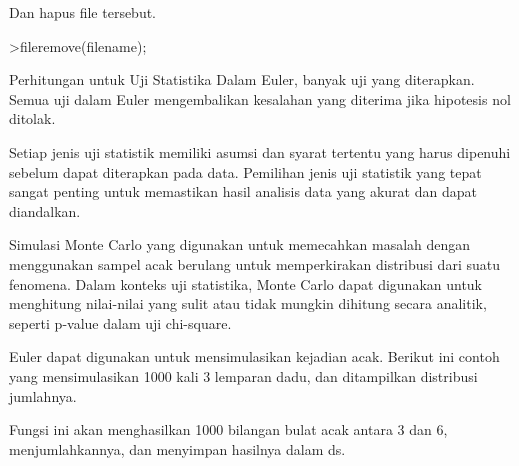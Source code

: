 \documentclass[a4paper,10pt]{article}
\begin{document}
\begin{eulernotebook}
\begin{eulercomment}
\begin{eulercomment}
\begin{eulercomment}
\begin{eulercomment}
\begin{eulercomment}
\begin{eulercomment}
\begin{eulercomment}
\begin{eulercomment}
\begin{eulercomment}
\begin{eulercomment}
\begin{eulercomment}
\begin{eulercomment}
\begin{eulercomment}
\begin{eulercomment}
\begin{eulercomment}
\begin{eulercomment}
\begin{eulercomment}
\begin{eulercomment}
\begin{euleroutput}
\end{euleroutput}
\begin{eulercomment}
Dan hapus file tersebut.
\end{eulercomment}
\begin{eulerprompt}
>fileremove(filename);
\end{eulerprompt}
\begin{eulercomment}
\begin{eulercomment}
\begin{eulercomment}
Perhitungan untuk Uji Statistika Dalam Euler, banyak uji yang
diterapkan. Semua uji dalam Euler mengembalikan kesalahan yang
diterima jika hipotesis nol ditolak.

Setiap jenis uji statistik memiliki asumsi dan syarat tertentu yang
harus dipenuhi sebelum dapat diterapkan pada data. Pemilihan jenis uji
statistik yang tepat sangat penting untuk memastikan hasil analisis
data yang akurat dan dapat diandalkan.

\end{eulercomment}
\begin{eulercomment}
Simulasi Monte Carlo yang digunakan untuk memecahkan masalah dengan
menggunakan sampel acak berulang untuk memperkirakan distribusi dari
suatu fenomena. Dalam konteks uji statistika, Monte Carlo dapat
digunakan untuk menghitung nilai-nilai yang sulit atau tidak mungkin
dihitung secara analitik, seperti p-value dalam uji chi-square.

Euler dapat digunakan untuk mensimulasikan kejadian acak. Berikut ini
contoh yang mensimulasikan 1000 kali 3 lemparan dadu, dan ditampilkan
distribusi jumlahnya.

Fungsi ini akan menghasilkan 1000 bilangan bulat acak antara 3 dan 6,
menjumlahkannya, dan menyimpan hasilnya dalam ds.


\end{eulercomment}
\end{eulercomment}
\end{eulercomment}
\end{eulercomment}
\end{eulercomment}
\end{eulercomment}
\end{eulercomment}
\end{eulercomment}
\end{eulercomment}
\end{eulercomment}
\end{eulercomment}
\end{eulercomment}
\end{eulercomment}
\end{eulercomment}
\end{eulercomment}
\end{eulercomment}
\end{eulercomment}
\end{eulercomment}
\end{eulercomment}
\end{eulercomment}
\end{eulercomment}
\end{eulernotebook}
\end{document}
